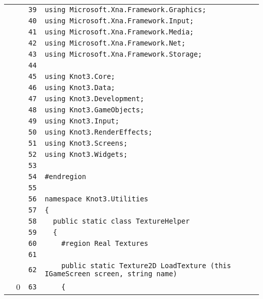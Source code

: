 \documentclass[a4paper,10pt]{article}
\begin{document}
\begin{longtable}[l]{lrrl}
\cellcolor{gray} &  & \verb~39~ & \verb~using Microsoft.Xna.Framework.Graphics;~\\
\cellcolor{gray} &  & \verb~40~ & \verb~using Microsoft.Xna.Framework.Input;~\\
\cellcolor{gray} &  & \verb~41~ & \verb~using Microsoft.Xna.Framework.Media;~\\
\cellcolor{gray} &  & \verb~42~ & \verb~using Microsoft.Xna.Framework.Net;~\\
\cellcolor{gray} &  & \verb~43~ & \verb~using Microsoft.Xna.Framework.Storage;~\\
\cellcolor{gray} &  & \verb~44~ & \verb~~\\
\cellcolor{gray} &  & \verb~45~ & \verb~using Knot3.Core;~\\
\cellcolor{gray} &  & \verb~46~ & \verb~using Knot3.Data;~\\
\cellcolor{gray} &  & \verb~47~ & \verb~using Knot3.Development;~\\
\cellcolor{gray} &  & \verb~48~ & \verb~using Knot3.GameObjects;~\\
\cellcolor{gray} &  & \verb~49~ & \verb~using Knot3.Input;~\\
\cellcolor{gray} &  & \verb~50~ & \verb~using Knot3.RenderEffects;~\\
\cellcolor{gray} &  & \verb~51~ & \verb~using Knot3.Screens;~\\
\cellcolor{gray} &  & \verb~52~ & \verb~using Knot3.Widgets;~\\
\cellcolor{gray} &  & \verb~53~ & \verb~~\\
\cellcolor{gray} &  & \verb~54~ & \verb~#endregion~\\
\cellcolor{gray} &  & \verb~55~ & \verb~~\\
\cellcolor{gray} &  & \verb~56~ & \verb~namespace Knot3.Utilities~\\
\cellcolor{gray} &  & \verb~57~ & \verb~{~\\
\cellcolor{gray} &  & \verb~58~ & \verb~  public static class TextureHelper~\\
\cellcolor{gray} &  & \verb~59~ & \verb~  {~\\
\cellcolor{gray} &  & \verb~60~ & \verb~    #region Real Textures~\\
\cellcolor{gray} &  & \verb~61~ & \verb~~\\
\cellcolor{gray} &  & \verb~62~ & \verb~    public static Texture2D LoadTexture (this IGameScreen screen, string name)~\\
\cellcolor{red} & 0 & \verb~63~ & \verb~    {~\\

\end{longtable}
\end{document}
